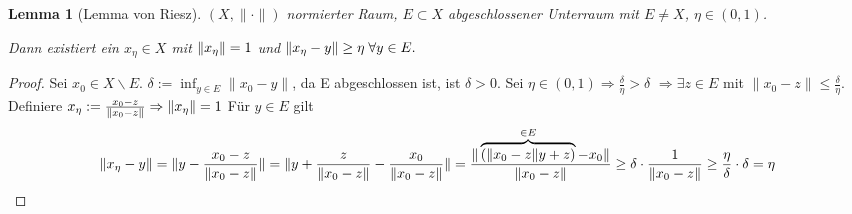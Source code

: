 \documentclass[ngerman]{report}
\theoremstyle{plain}%
\newtheorem{lemma}[thm]{Lemma}
\theoremstyle{definition}%
\theoremstyle{myStyle}
\newcommand{\norm}[1]{\|#1\|}
\newcommand{\df}[1][]{%
	\overset{#1}{\Rightarrow}
}
\begin{document}
	\begin{lemma}[Lemma von Riesz]%
		$(X,\norm{\cdot})$ normierter Raum, $E\subset X$ abgeschlossener Unterraum mit $E \not = X$, $\eta\in (0,1)$. \par
		Dann existiert ein $x_\eta \in X$ mit $\norm{\xt} = 1$ und $\norm{\xt - y} \geq \eta \; \forall y\in E.$
	\end{lemma}
	\begin{proof}
		Sei $x_0 \in X\backslash E$. $\delta := \inf_{y\in E} \norm{x_0 - y}$, da E abgeschlossen ist, ist $\delta > 0$. Sei $\eta \in (0,1) \df \frac{\delta}{\eta} > \delta $ $\df \exists z\in E$ mit $\norm{x_0 - z} \leq \frac{\delta}{\eta}.$ Definiere $\xt := \frac{x_0-z}{\norm{x_0 - z}} \df \norm{\xt} = 1$
		Für $y\in E$ gilt 
		$$\norm{\xt - y} = \norm{y - \frac{x_0-z}{\norm{x_0 - z}}} 
		= \norm{y + \frac{z}{\norm{x_0 - z}} - \frac{x_0}{\norm{x_0 - z}}} 
		= \frac{\norm{\overbrace{(\norm{x_0 - z}y + z)}^{\in E} - x_0}}{\norm{x_0 - z}}  
		\geq \delta\cdot \frac{1}{\norm{x_0 - z}} \geq \frac{\eta}{\delta} \cdot \delta = \eta$$


	\end{proof}	
\end{document}
